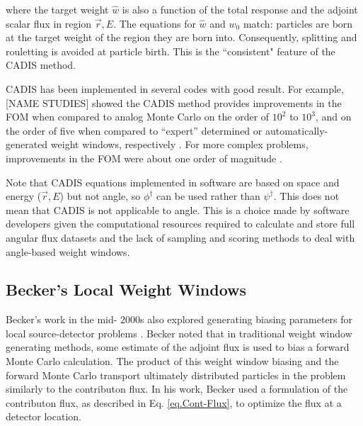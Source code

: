 where the target weight $\hat{w}$ is also a function of the total response and
the adjoint scalar flux in region $\vec{r}, E$.
The equations for $\hat{w}$ and $w_0$ match: particles are born at the target weight
of the region they are born into. Consequently, splitting
and rouletting is avoided at particle birth. This is the ``consistent" feature of the CADIS method.

CADIS has been implemented in several codes with good result. For example, [NAME STUDIES] showed the CADIS method provides improvements in the FOM
when compared to analog Monte Carlo on the order of $10^2$ to $10^3$,
and on the order of five
when compared to ``expert'' determined or automatically-generated weight
windows, respectively \cite{wagner_automated_1998, wagner_automated_2002}.
For more complex
problems, 
improvements in the FOM were about one order of magnitude
\cite{wagner_automatic_1997, wagner_automated_1998}.

Note that CADIS equations implemented in software
are based on space and energy ($\vec{r}, E$) but not angle, so
$\phi^{\dagger}$ can be used rather than $\psi^{\dagger}$. This does not mean
that CADIS is not applicable to angle. This is a choice made by software
developers given the computational resources required to calculate and store
full angular flux datasets and the lack of sampling and scoring methods to deal with angle-based weight windows.

\subsection{Becker's Local Weight Windows}
\label{sec:beckerlocal}

Becker's work in the mid- 2000s also explored generating biasing parameters for
local source-detector problems \cite{becker_hybrid_2009}. Becker noted that in
traditional weight window generating methods, some estimate of the adjoint
flux is used to bias a forward Monte Carlo calculation. The product of this
weight window biasing and the forward Monte Carlo transport ultimately
distributed particles in the problem similarly to the contributon flux.
In his work, Becker
used a formulation of the contributon flux, as described in Eq.
\eqref{eq.Cont-Flux}, to optimize the flux at a detector location. 

